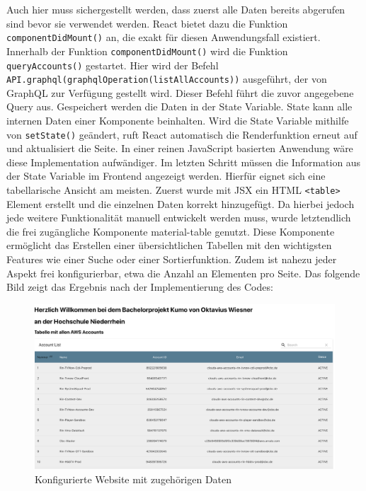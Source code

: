 Auch hier muss sichergestellt werden, dass zuerst alle Daten bereits abgerufen sind bevor sie verwendet werden.
React bietet dazu die Funktion \verb+componentDidMount()+ an, die exakt für diesen Anwendungsfall existiert. \cite[]{ReactComp}
Innerhalb der Funktion \verb+componentDidMount()+ wird die Funktion \verb+queryAccounts()+ gestartet.
Hier wird der Befehl \verb+API.graphql(graphqlOperation(listAllAccounts))+ ausgeführt, der von GraphQL zur Verfügung gestellt wird. \cite[]{AmplifyAPI}
Dieser Befehl führt die zuvor angegebene Query aus.
Gespeichert werden die Daten in der State Variable.
State kann alle internen Daten einer Komponente beinhalten.
Wird die State Variable mithilfe von \verb+setState()+ geändert, ruft React automatisch die Renderfunktion erneut auf und aktualisiert die Seite.
In einer reinen JavaScript basierten Anwendung wäre diese Implementation aufwändiger.
Im letzten Schritt müssen die Information aus der State Variable im Frontend angezeigt werden.
Hierfür eignet sich eine tabellarische Ansicht am meisten.
Zuerst wurde mit JSX ein HTML \verb+<table>+ Element erstellt und die einzelnen Daten korrekt hinzugefügt.
Da hierbei jedoch jede weitere Funktionalität manuell entwickelt werden muss, wurde letztendlich die frei zugängliche Komponente \glqq material-table\grqq{} genutzt.
Diese Komponente ermöglicht das Erstellen einer übersichtlichen Tabellen mit den wichtigsten Features wie einer Suche oder einer Sortierfunktion.
Zudem ist nahezu jeder Aspekt frei konfigurierbar, etwa die Anzahl an Elementen pro Seite.
 Das folgende Bild zeigt das Ergebnis nach der Implementierung des Codes:
\clearpage
 \begin{figure}[htbp]
    \centering
    \includegraphics[width=1.0\textwidth]{50-Implementierung/Webanwendung.png}
    \caption{Konfigurierte Website mit zugehörigen Daten}
    \label{fig:meine-grafik}
\end{figure}

